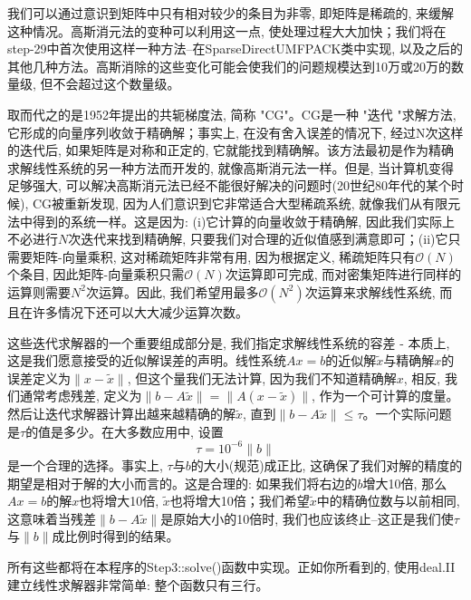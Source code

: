 \documentclass[12pt, a4paper, oneside]{ctexart}
\begin{document}
我们可以通过意识到矩阵中只有相对较少的条目为非零, 即矩阵是稀疏的, 来缓解这种情况。高斯消元法的变种可以利用这一点, 使处理过程大大加快；我们将在step-29中首次使用这样一种方法--在SparseDirectUMFPACK类中实现, 以及之后的其他几种方法。高斯消除的这些变化可能会使我们的问题规模达到10万或20万的数量级, 但不会超过这个数量级。

取而代之的是1952年提出的共轭梯度法, 简称 "CG"。CG是一种 "迭代 "求解方法, 它形成的向量序列收敛于精确解；事实上, 在没有舍入误差的情况下, 经过N次这样的迭代后, 如果矩阵是对称和正定的, 它就能找到精确解。该方法最初是作为精确求解线性系统的另一种方法而开发的, 就像高斯消元法一样。但是, 当计算机变得足够强大, 可以解决高斯消元法已经不能很好解决的问题时(20世纪80年代的某个时候), CG被重新发现, 因为人们意识到它非常适合大型稀疏系统, 就像我们从有限元法中得到的系统一样。这是因为: (i)它计算的向量收敛于精确解, 因此我们实际上不必进行$N$次迭代来找到精确解, 只要我们对合理的近似值感到满意即可；(ii)它只需要矩阵-向量乘积, 这对稀疏矩阵非常有用, 因为根据定义, 稀疏矩阵只有$\mathcal{O}(N)$个条目, 因此矩阵-向量乘积只需$\mathcal{O}(N)$次运算即可完成, 而对密集矩阵进行同样的运算则需要$N^2$次运算。因此, 我们希望用最多$\mathcal{O}(N^2)$次运算来求解线性系统, 而且在许多情况下还可以大大减少运算次数。

这些迭代求解器的一个重要组成部分是, 我们指定求解线性系统的容差 - 本质上, 这是我们愿意接受的近似解误差的声明。线性系统$Ax=b$的近似解$\tilde{x}$与精确解$x$的误差定义为$\|x-\tilde{x}\|$, 但这个量我们无法计算, 因为我们不知道精确解$ x $, 相反, 我们通常考虑残差, 定义为$\|b-A\tilde{x}\|=\|A(x-\tilde{x})\|$, 作为一个可计算的度量。然后让迭代求解器计算出越来越精确的解$\tilde{x}$, 直到$\|b-A\tilde{x}\|\le \tau$。一个实际问题是$\tau$的值是多少。在大多数应用中, 设置
$$\tau=10^{-6}\|b\|$$
是一个合理的选择。事实上, $\tau$与$b$的大小(规范)成正比, 这确保了我们对解的精度的期望是相对于解的大小而言的。这是合理的: 如果我们将右边的$b$增大10倍, 那么$Ax=b$的解$x$也将增大10倍, $\tilde{x}$也将增大10倍；我们希望$\tilde{x}$中的精确位数与以前相同, 这意味着当残差$\|b-A\tilde{x}\|$是原始大小的10倍时, 我们也应该终止--这正是我们使$\tau$与$\|b\|$成比例时得到的结果。

所有这些都将在本程序的Step3::solve()函数中实现。正如你所看到的, 使用deal.II建立线性求解器非常简单: 整个函数只有三行。
\end{document}
